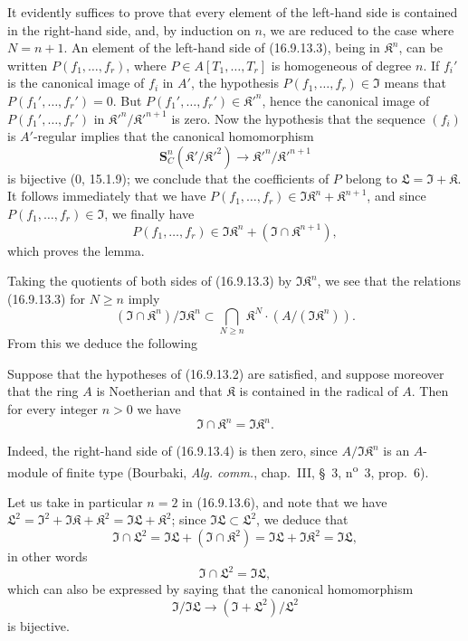 It evidently suffices to prove that every element of the left-hand side is
contained in the right-hand side, and, by induction on $n$, we are reduced
to the case where $N=n+1$. An element of the left-hand side of (16.9.13.3),
being in $\mathfrak{K}^n$, can be written $P(f_1,\ldots,f_r)$, where
$P\in A[T_1,\ldots,T_r]$ is homogeneous of degree $n$. If $f_i'$ is the
canonical image of $f_i$ in $A'$, the hypothesis
$P(f_1,\ldots,f_r)\in\mathfrak{I}$ means that
$P(f_1',\ldots,f_r')=0$. But
$P(f_1',\ldots,f_r')\in\mathfrak{K}'^n$, hence the canonical image of
$P(f_1',\ldots,f_r')$ in
$\mathfrak{K}'^n/\mathfrak{K}'^{n+1}$ is zero. Now the hypothesis that the
sequence $(f_i)$ is $A'$-regular implies that the canonical homomorphism
\[
  \mathbf{S}_C^n(\mathfrak{K}'/\mathfrak{K}'^2)
  \longrightarrow\mathfrak{K}'^n/\mathfrak{K}'^{n+1}
\]
is bijective (0, 15.1.9); we conclude that the coefficients of $P$ belong
to $\mathfrak{L}=\mathfrak{I}+\mathfrak{K}$. It follows immediately that we
have $P(f_1,\ldots,f_r)\in\mathfrak{I}\mathfrak{K}^n+\mathfrak{K}^{n+1}$, and
since $P(f_1,\ldots,f_r)\in\mathfrak{I}$, we finally have
\[
  P(f_1,\ldots,f_r)
  \in\mathfrak{I}\mathfrak{K}^n
    +(\mathfrak{I}\cap\mathfrak{K}^{n+1}),
\]
which proves the lemma.

Taking the quotients of both sides of (16.9.13.3) by
$\mathfrak{I}\mathfrak{K}^n$, we see that the relations (16.9.13.3) for
$N\geq n$ imply
\[
  (\mathfrak{I}\cap\mathfrak{K}^n)/\mathfrak{I}\mathfrak{K}^n
  \subset\bigcap_{N\geq n}\mathfrak{K}^N
    \cdot(A/(\mathfrak{I}\mathfrak{K}^n)).
  \tag{16.9.13.4}
  \label{IV.16.9.13.4}
\]
From this we deduce the following

\begin{corollary}[16.9.13.5]
\label{IV.16.9.13.5}
Suppose that the hypotheses of (16.9.13.2) are satisfied, and suppose
moreover that the ring $A$ is Noetherian and that $\mathfrak{K}$ is contained
in the radical of $A$. Then for every integer $n>0$ we have
\[
  \mathfrak{I}\cap\mathfrak{K}^n=\mathfrak{I}\mathfrak{K}^n.
  \tag{16.9.13.6}
  \label{IV.16.9.13.6}
\]
\end{corollary}

Indeed, the right-hand side of (16.9.13.4) is then zero, since
$A/\mathfrak{I}\mathfrak{K}^n$ is an $A$-module of finite type (Bourbaki,
\emph{Alg. comm.}, chap.~III, §~3, n\textsuperscript{o}~3, prop.~6).

Let us take in particular $n=2$ in (16.9.13.6), and note that we have
$\mathfrak{L}^2=\mathfrak{I}^2+\mathfrak{I}\mathfrak{K}+\mathfrak{K}^2
=\mathfrak{I}\mathfrak{L}+\mathfrak{K}^2$; since
$\mathfrak{I}\mathfrak{L}\subset\mathfrak{L}^2$, we deduce that
\[
  \mathfrak{I}\cap\mathfrak{L}^2
  =\mathfrak{I}\mathfrak{L}+(\mathfrak{I}\cap\mathfrak{K}^2)
  =\mathfrak{I}\mathfrak{L}+\mathfrak{I}\mathfrak{K}^2
  =\mathfrak{I}\mathfrak{L},
\]
in other words
\[
  \mathfrak{I}\cap\mathfrak{L}^2=\mathfrak{I}\mathfrak{L},
  \tag{16.9.13.7}
  \label{IV.16.9.13.7}
\]
which can also be expressed by saying that the canonical homomorphism
\[
  \mathfrak{I}/\mathfrak{I}\mathfrak{L}
  \longrightarrow(\mathfrak{I}+\mathfrak{L}^2)/\mathfrak{L}^2
\]
is bijective.

